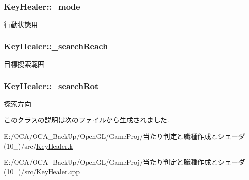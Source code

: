 \hypertarget{class_key_healer_adc6356b370bcde5739011c381d125503}{
\subsubsection[{\-\_\-mode}]{ Key\-Healer\-::\-\_\-mode\hspace{0.3cm}{\ttfamily [protected]}}}\label{class_key_healer_adc6356b370bcde5739011c381d125503}


行動状態用 

\hypertarget{class_key_healer_a3160dc53c3204308a587966fac89a0f8}{
\subsubsection[{\-\_\-search\-Reach}]{ Key\-Healer\-::\-\_\-search\-Reach\hspace{0.3cm}{\ttfamily [protected]}}}\label{class_key_healer_a3160dc53c3204308a587966fac89a0f8}


目標捜索範囲 

\hypertarget{class_key_healer_af54b304d55b65e52fb65301d4e2ea1d7}{
\subsubsection[{\-\_\-search\-Rot}]{ Key\-Healer\-::\-\_\-search\-Rot\hspace{0.3cm}{\ttfamily [protected]}}}\label{class_key_healer_af54b304d55b65e52fb65301d4e2ea1d7}


探索方向 



このクラスの説明は次のファイルから生成されました\-:\begin{DoxyCompactItemize}
\item 
E\-:/\-O\-C\-A/\-O\-C\-A\-\_\-\-Back\-Up/\-Open\-G\-L/\-Game\-Proj/当たり判定と職種作成とシェーダ(10\-\_)/src/\hyperlink{_key_healer_8h}{Key\-Healer.\-h}\item 
E\-:/\-O\-C\-A/\-O\-C\-A\-\_\-\-Back\-Up/\-Open\-G\-L/\-Game\-Proj/当たり判定と職種作成とシェーダ(10\-\_)/src/\hyperlink{_key_healer_8cpp}{Key\-Healer.\-cpp}\end{DoxyCompactItemize}
